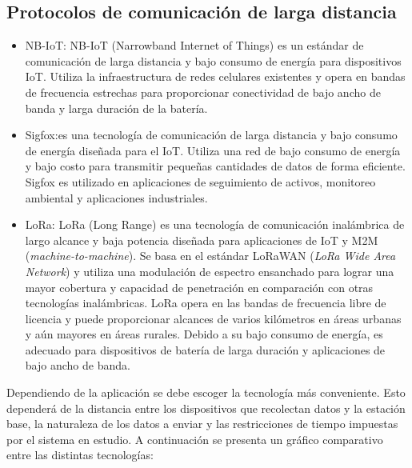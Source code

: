 \subsection{Protocolos de comunicación de larga distancia}

\begin{itemize}

    \item NB-IoT: NB-IoT (Narrowband Internet of Things) es un estándar de comunicación de larga distancia y bajo consumo de energía para dispositivos IoT. Utiliza la infraestructura de redes celulares existentes y opera en bandas de frecuencia estrechas para proporcionar conectividad de bajo ancho de banda y larga duración de la batería.
    \item Sigfox:es una tecnología de comunicación de larga distancia y bajo consumo de energía diseñada para el IoT. Utiliza una red de bajo consumo de energía y bajo costo para transmitir pequeñas cantidades de datos de forma eficiente. Sigfox es utilizado en aplicaciones de seguimiento de activos, monitoreo ambiental y aplicaciones industriales. 
    \item LoRa: LoRa (Long Range) es una tecnología de comunicación inalámbrica de largo alcance y baja potencia diseñada para aplicaciones de IoT y M2M (\textit{machine-to-machine}). Se basa en el estándar LoRaWAN (\textit{LoRa Wide Area Network}) y utiliza una modulación de espectro ensanchado para lograr una mayor cobertura y capacidad de penetración en comparación con otras tecnologías inalámbricas. LoRa opera en las bandas de frecuencia libre de licencia y puede proporcionar alcances de varios kilómetros en áreas urbanas y aún mayores en áreas rurales. Debido a su bajo consumo de energía, es adecuado para dispositivos de batería de larga duración y aplicaciones de bajo ancho de banda.
\end{itemize}

Dependiendo de la aplicación se debe escoger la tecnología más conveniente. Esto dependerá de la distancia entre los dispositivos que recolectan datos y la estación base, la naturaleza de los datos a enviar y las restricciones de tiempo impuestas por el sistema en estudio. A continuación se presenta un gráfico comparativo entre las distintas tecnologías:

